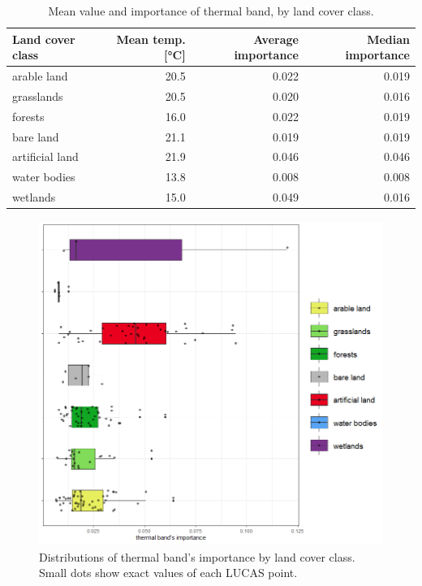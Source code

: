 \documentclass{amuthesis}
\begin{document}
\hypertarget{tbl-tabela6}{}
\begin{table}
\caption{\label{tbl-tabela6}Mean value and importance of thermal band, by land cover class. }\tabularnewline

\centering
\begin{tabular}{|>{}l|>{}r|>{}r|>{}r|}
\toprule
\textbf{Land cover class} & \textbf{Mean temp. [°C]} & \textbf{Average importance} & \textbf{Median importance}\\
\midrule
arable land & 20.5 & 0.022 & 0.019\\
\hline
grasslands & 20.5 & 0.020 & 0.016\\
\hline
forests & 16.0 & 0.022 & 0.019\\
\hline
bare land & 21.1 & 0.019 & 0.019\\
\hline
artificial land & 21.9 & 0.046 & 0.046\\
\hline
water bodies & 13.8 & 0.008 & 0.008\\
\hline
wetlands & 15.0 & 0.049 & 0.016\\
\bottomrule
\end{tabular}
\end{table}

\begin{figure}[H]

{\centering \includegraphics[width=4.45833in,height=4.16667in]{./figures/importance_classes.png}

}

\caption{\label{fig-rycina14}Distributions of thermal band's importance
by land cover class. Small dots show exact values of each LUCAS point.}

\end{figure}
\end{document}
